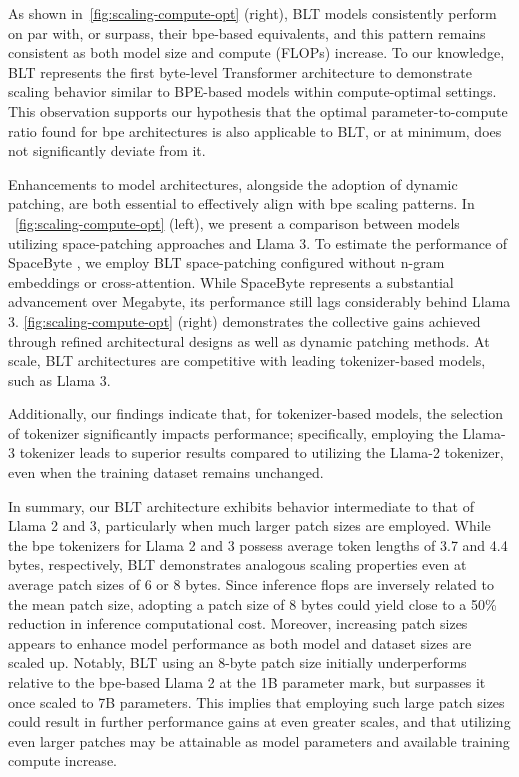 As shown in~\autoref{fig:scaling-compute-opt} (right), {\textsc BLT} models consistently perform on par with, or surpass, their bpe-based equivalents, and this pattern remains consistent as both model size and compute (FLOPs) increase. To our knowledge, {\textsc BLT} represents the first byte-level Transformer architecture to demonstrate scaling behavior similar to BPE-based models within compute-optimal settings. This observation supports our hypothesis that the optimal parameter-to-compute ratio found for bpe architectures is also applicable to {\textsc BLT}, or at minimum, does not significantly deviate from it.

Enhancements to model architectures, alongside the adoption of dynamic patching, are both essential to effectively align with bpe scaling patterns. In ~\autoref{fig:scaling-compute-opt} (left), we present a comparison between models utilizing space-patching approaches and Llama 3. To estimate the performance of SpaceByte \citep{slagle2024spacebyte}, we employ {\textsc BLT} space-patching configured without n-gram embeddings or cross-attention. While SpaceByte represents a substantial advancement over Megabyte, its performance still lags considerably behind Llama 3. \autoref{fig:scaling-compute-opt} (right) demonstrates the collective gains achieved through refined architectural designs as well as dynamic patching methods. At scale, {\textsc BLT} architectures are competitive with leading tokenizer-based models, such as Llama 3.

Additionally, our findings indicate that, for tokenizer-based models, the selection of tokenizer significantly impacts performance; specifically, employing the Llama-3 tokenizer leads to superior results compared to utilizing the Llama-2 tokenizer, even when the training dataset remains unchanged.

In summary, our {\textsc BLT} architecture exhibits behavior intermediate to that of Llama 2 and 3, particularly when much larger patch sizes are employed. While the bpe tokenizers for Llama 2 and 3 possess average token lengths of 3.7 and 4.4 bytes, respectively, {\textsc BLT} demonstrates analogous scaling properties even at average patch sizes of 6 or 8 bytes. Since inference flops are inversely related to the mean patch size, adopting a patch size of 8 bytes could yield close to a 50\% reduction in inference computational cost. Moreover, increasing patch sizes appears to enhance model performance as both model and dataset sizes are scaled up. Notably, {\textsc BLT} using an 8-byte patch size initially underperforms relative to the bpe-based Llama 2 at the 1B parameter mark, but surpasses it once scaled to 7B parameters. This implies that employing such large patch sizes could result in further performance gains at even greater scales, and that utilizing even larger patches may be attainable as model parameters and available training compute increase.

